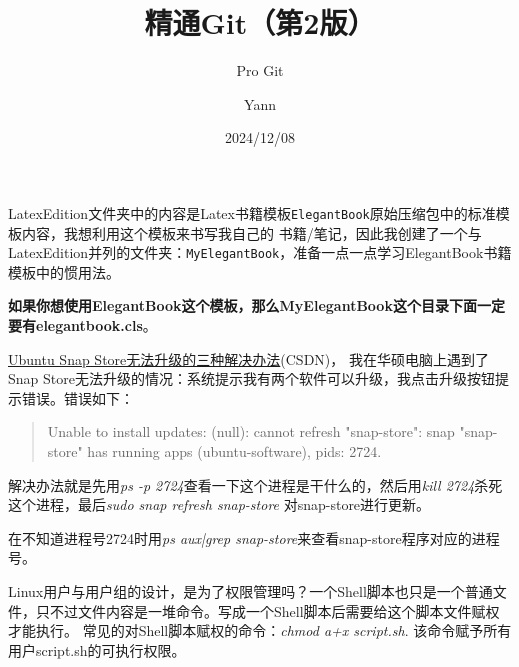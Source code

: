 \documentclass[lang=cn,newtx,12pt,scheme=chinese]{elegantbook}
\title{精通Git（第2版）}
\subtitle{Pro Git}
\author{Yann}
\date{2024/12/08}
\begin{document}
\maketitle
\frontmatter

\tableofcontents

\mainmatter

LatexEdition文件夹中的内容是Latex书籍模板\lstinline{ElegantBook}原始压缩包中的标准模板内容，我想利用这个模板来书写我自己的
书籍/笔记，因此我创建了一个与LatexEdition并列的文件夹：\lstinline{MyElegantBook}，准备一点一点学习ElegantBook书籍模板中的惯用法。

\textbf{如果你想使用ElegantBook这个模板，那么MyElegantBook这个目录下面一定要有elegantbook.cls}。

\href{https://blog.csdn.net/qq_44935032/article/details/130721017}{Ubuntu Snap Store无法升级的三种解决办法}(CSDN)，
我在华硕电脑上遇到了Snap Store无法升级的情况：系统提示我有两个软件可以升级，我点击升级按钮提示错误。错误如下：

\begin{quotation}
    Unable to install updates: (null): cannot refresh "snap-store": snap "snap-store" has running apps (ubuntu-software), 
    pids: 2724.
\end{quotation}

解决办法就是先用\textit{ps -p 2724}查看一下这个进程是干什么的，然后用\textit{kill 2724}杀死这个进程，最后\textit{sudo snap refresh snap-store}
对snap-store进行更新。

在不知道进程号2724时用\textit{ps aux|grep snap-store}来查看snap-store程序对应的进程号。

Linux用户与用户组的设计，是为了权限管理吗？一个Shell脚本也只是一个普通文件，只不过文件内容是一堆命令。写成一个Shell脚本后需要给这个脚本文件赋权才能执行。
常见的对Shell脚本赋权的命令：\textit{chmod a+x script.sh}. 该命令赋予所有用户script.sh的可执行权限。
\end{document}

